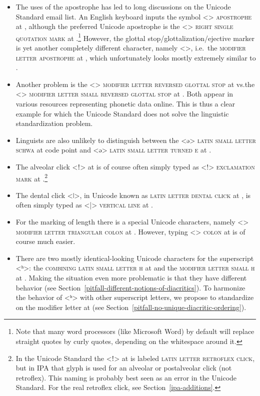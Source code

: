\begin{itemize}

   \item The uses of the apostrophe has led to long discussions on the Unicode
        Standard email list. An English keyboard inputs the symbol
        <> \textsc{apostrophe} at , although the preferred Unicode
        apostrophe is the <> \textsc{right single quotation mark} at
        .\footnote{Note that many word processors (like Microsoft
        Word) by default will replace straight quotes by curly quotes,
        depending on the whitespace around it.} However, the glottal
        stop/glottalization/ejective marker is yet another completely different
        character, namely <>, i.e.~the \textsc{modifier letter apostrophe} 
        at , which unfortunately looks mostly extremely similar to
        . 
  \item Another problem is the <> \textsc{modifier letter reversed glottal
        stop} at  vs.\@ the <> \textsc{modifier letter small reversed
        glottal stop} at . Both appear in various resources
        representing phonetic data online. This is thus a clear example for
        which the Unicode Standard does not solve the linguistic standardization
        problem.
  \item Linguists are also unlikely to distinguish between the <ə>
        \textsc{latin small letter schwa} at code point  and <ǝ>
        \textsc{latin small letter turned e} at .
  \item The alveolar click <ǃ> at  is of course often simply
        typed as <!> \textsc{exclamation mark} at .\footnote{In the
        Unicode Standard the <ǃ> at  is labeled \textsc{latin letter
        retroflex click}, but in IPA that glyph is used for an alveolar or
        postalveolar click (not retroflex). This naming is probably best seen as
        an error in the Unicode Standard. For the real retroflex click, see 
        Section~\ref{ipa-additions}.}
  \item The dental click <ǀ>, in Unicode known as \textsc{latin letter dental
        click} at , is often simply typed as <|> \textsc{vertical
        line} at .
  \item For the marking of length there is a special Unicode characters, namely
        <> \textsc{modifier letter triangular colon} at . However,
        typing <> \textsc{colon} at  is of course much easier.        
  \item There are two mostly identical-looking Unicode characters for the superscript
        <ʰ>: the \textsc{combining latin small letter h} at  and the
        \textsc{modifier letter small h} at . Making the situation 
        even more problematic is that they have different behavior (see 
        Section~\ref{pitfall-different-notions-of-diacritics}). To harmonize the 
        behavior of <ʰ> with other superscript letters, we propose to 
        standardize on the modifier letter at  (see 
        Section~\ref{pitfall-no-unique-diacritic-ordering}).
  

\end{itemize}
